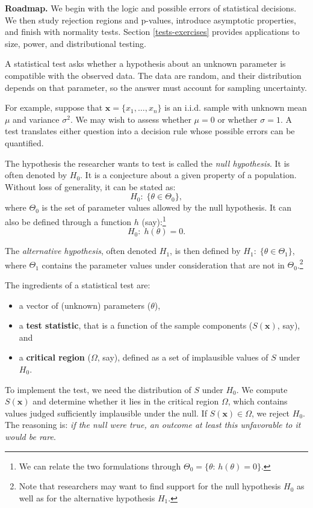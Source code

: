 \documentclass[
  11pt,
]{book}
\providecommand{\tightlist}{%
  \setlength{\itemsep}{0pt}\setlength{\parskip}{0pt}}
\theoremstyle{definition}
\theoremstyle{definition}
\theoremstyle{definition}
\theoremstyle{definition}
\theoremstyle{remark}
\begin{document}
\textbf{Roadmap.} We begin with the logic and possible errors of statistical decisions. We then study rejection regions and p-values, introduce asymptotic properties, and finish with normality tests. Section \ref{tests-exercises} provides applications to size, power, and distributional testing.

A statistical test asks whether a hypothesis about an unknown parameter is compatible with the observed data. The data are random, and their distribution depends on that parameter, so the answer must account for sampling uncertainty.

For example, suppose that \(\mathbf{x}=\{x_1,\dots,x_n\}\) is an i.i.d. sample with unknown mean \(\mu\) and variance \(\sigma^2\). We may wish to assess whether \(\mu=0\) or whether \(\sigma=1\). A test translates either question into a decision rule whose possible errors can be quantified.

The hypothesis the researcher wants to test is called the \emph{null hypothesis}. It is often denoted by \(H_0\). It is a conjecture about a given property of a population. Without loss of generality, it can be stated as:
\[
H_0:\;\{\theta \in \Theta_0\},
\]
where \(\Theta_0\) is the set of parameter values allowed by the null hypothesis. It can also be defined through a function \(h\) (say):\footnote{We can relate the two formulations through \(\Theta_0 = \{\theta:\,h(\theta)=0\}\).}
\[
H_0:\;h(\theta)=0.
\]

The \emph{alternative hypothesis}, often denoted \(H_1\), is then defined by \(H_1:\;\{\theta \in \Theta_1\}\), where \(\Theta_1\) contains the parameter values under consideration that are not in \(\Theta_0\).\footnote{Note that researchers may want to find support for the null hypothesis \(H_0\) as well as for the alternative hypothesis \(H_1\).}

The ingredients of a statistical test are:

\begin{itemize}
\tightlist
\item
  a vector of (unknown) parameters (\(\theta\)),
\item
  a \textbf{test statistic}, that is a function of the sample components (\(S(\mathbf{x})\), say), and
\item
  a \textbf{critical region} (\(\Omega\), say), defined as a set of implausible values of \(S\) under \(H_0\).
\end{itemize}

To implement the test, we need the distribution of \(S\) under \(H_0\). We compute \(S(\mathbf{x})\) and determine whether it lies in the critical region \(\Omega\), which contains values judged sufficiently implausible under the null. If \(S(\mathbf{x})\in\Omega\), we reject \(H_0\). The reasoning is: \emph{if the null were true, an outcome at least this unfavorable to it would be rare}.
\end{document}
